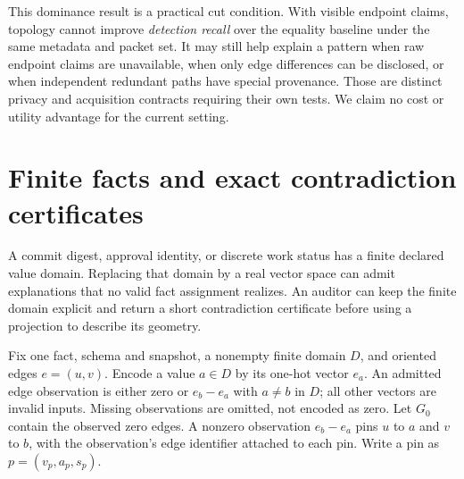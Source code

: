 \documentclass[11pt,a4paper]{article}
\begin{document}
This dominance result is a practical cut condition. With visible endpoint claims, topology cannot improve \emph{detection recall} over the equality baseline under the same metadata and packet set. It may still help explain a pattern when raw endpoint claims are unavailable, when only edge differences can be disclosed, or when independent redundant paths have special provenance. Those are distinct privacy and acquisition contracts requiring their own tests. We claim no cost or utility advantage for the current setting.

\section{Finite facts and exact contradiction certificates}\label{sec:categorical}
A commit digest, approval identity, or discrete work status has a finite declared
value domain. Replacing that domain by a real vector space can admit explanations
that no valid fact assignment realizes. An auditor can keep the finite domain
explicit and return a short contradiction certificate before using a projection
to describe its geometry.

Fix one fact, schema and snapshot, a nonempty finite domain $D$, and oriented
edges $e=(u,v)$. Encode a value $a\in D$ by its one-hot vector $e_a$. An admitted
edge observation is either zero or $e_b-e_a$ with $a\ne b$ in $D$; all other
vectors are invalid inputs. Missing observations are omitted, not encoded as
zero. Let $G_0$ contain the observed zero edges. A nonzero observation
$e_b-e_a$ pins $u$ to $a$ and $v$ to $b$, with the observation's edge identifier
attached to each pin. Write a pin as $p=(v_p,a_p,s_p)$.
\end{document}
